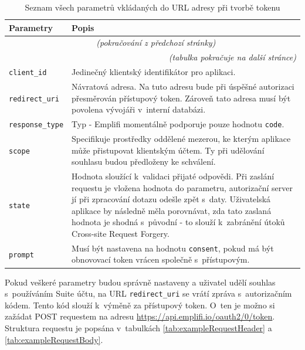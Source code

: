 \documentclass[czech, bc, kiv, he, iso690numb]{fasthesis}
\begin{document}
	\begin{longtable}{p{}p{}}
	\caption{Seznam všech parametrů vkládaných do URL adresy při tvorbě tokenu \cite{emplifiDocs}}
	\label{tab:allParametersAPI}\\
	\toprule[1.5pt]
	\textbf{Parametry} & \textbf{Popis}\\
	\midrule
	\endfirsthead
	\multicolumn{2}{c}{\tablename{}~\thetable{} \textit{(pokračování z předchozí stránky)}}\\
	\endhead
	\midrule
	\multicolumn{2}{r}{\textit{(tabulka pokračuje na další stránce)}}\\
	\endfoot
	\bottomrule[1.5pt]
	\endlastfoot
	\verb"client_id" &  Jedinečný klientský identifikátor pro aplikaci.\\
	\midrule
	\verb"redirect_uri" & Návratová adresa. Na tuto adresu bude při úspěšné autorizaci přesměrován přístupový token. Zároveň tato adresa musí být povolena vývojáři v~interní databázi.\\
	\midrule
	\verb"response_type" & Typ - Emplifi momentálně podporuje pouze hodnotu \texttt{code}.\\
	\midrule
	\verb"scope" & Specifikuje prostředky oddělené mezerou, ke kterým aplikace může přistupovat klientským účtem. Ty při udělování souhlasu budou předloženy ke schválení. \\
	\midrule
	\verb"state" & Hodnota sloužící k~validaci přijaté odpovědi. Při zaslání requestu je vložena hodnota do parametru, autorizační server jí při zpracování dotazu odešle zpět s~daty. Uživatelská aplikace by následně měla porovnávat, zda tato zaslaná hodnota je shodná s~původní - to slouží k~zabránění útoků Cross-site Request Forgery.\\
	\midrule
	\verb"prompt" & Musí být nastavena na hodnotu \texttt{consent}, pokud má být obnovovací token vrácen společně s~přístupovým.\\
	\end{longtable}

Pokud veškeré parametry budou správně nastaveny a uživatel udělí souhlas s~používáním Suite účtu, na URL \texttt{redirect\_uri} se vrátí zpráva s~autorizačním kódem. Tento kód
slouží k~výměně za přístupový token. O~ten je možno si zažádat POST requestem na adresu \url{https://api.emplifi.io/oauth2/0/token}. Struktura requestu je popsána v~tabulkách \ref{tab:exampleRequestHeader} a \ref{tab:exampleRequestBody}.
\end{document}
